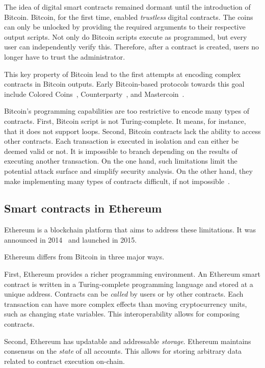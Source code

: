 The idea of digital smart contracts remained dormant until the introduction of Bitcoin.
Bitcoin, for the first time, enabled \textit{trustless} digital contracts.
The coins can only be unlocked by providing the required arguments to their respective output scripts.
Not only do Bitcoin scripts execute as programmed, but every user can independently verify this.
Therefore, after a contract is created, users no longer have to trust the administrator.

This key property of Bitcoin lead to the first attempts at encoding complex contracts in Bitcoin outputs.
Early Bitcoin-based protocols towards this goal include Colored Coins~\cite{Rosenfeld2012}, Counterparty~\cite{Counterparty, Bartoletti2017a}, and Mastercoin~\cite{Willett2016}.

Bitcoin's programming capabilities are too restrictive to encode many types of contracts.
First, Bitcoin script is not Turing-complete.
It means, for instance, that it does not support loops.
Second, Bitcoin contracts lack the ability to access other contracts.
Each transaction is executed in isolation and can either be deemed valid or not.
It is impossible to branch depending on the results of executing another transaction.
On the one hand, such limitations limit the potential attack surface and simplify security analysis.
On the other hand, they make implementing many types of contracts difficult, if not impossible~\cite{Miller2019}.


\subsection{Smart contracts in Ethereum}

Ethereum is a blockchain platform that aims to address these limitations.
It was announced in 2014~\cite{Buterin2014, Wood2014} and launched in 2015.

Ethereum differs from Bitcoin in three major ways.

First, Ethereum provides a richer programming environment.
An Ethereum smart contract is written in a Turing-complete programming language and stored at a unique address.
Contracts can be \textit{called} by users or by other contracts.
Each transaction can have more complex effects than moving cryptocurrency units, such as changing state variables.
This interoperability allows for composing contracts.

Second, Ethereum has updatable and addressable \textit{storage}.
Ethereum maintains consensus on the \textit{state} of all accounts.
This allows for storing arbitrary data related to contract execution on-chain.

